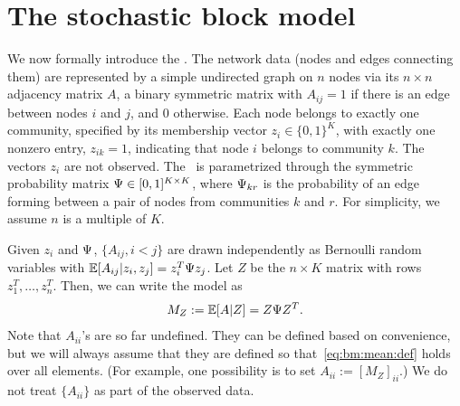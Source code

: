 %
\section{The stochastic block model}\label{sec:SBM:def}
We now formally introduce the \SBM.   The network data (nodes and edges connecting them) are represented by a
simple undirected graph on $n$ nodes via its $n \times n$ adjacency
matrix $A$, a binary symmetric matrix with %
$A_{ij} = 1$ if there is an edge between nodes $i$ and $j$, and 0
otherwise.   Each node belongs to exactly one community, specified by
its membership vector $z_i \in \{0,1\}^K$, with exactly one
nonzero entry, $z_{ik} = 1$, indicating that node $i$ belongs to community $k$.  The vectors $z_i$ are not observed.   
The \SBM\ is parametrized through the symmetric probability matrix $\Psi \in
[0,1]^{K \times K}$, where $\Psi_{kr}$ is the probability of an edge
forming between a pair of nodes from communities $k$ and $r$. For
simplicity, we assume $n$ is a multiple of $K$. 

Given $z_i$ and $\Psi$, $\{A_{ij}, i < j\}$ are drawn independently as
Bernoulli random variables with $\mathbb{E}[A_{ij} | z_i,z_j] = z_i^T \Psi
z_j$. Let $Z$ be the $n \times K$ matrix with rows $z_1^T,\dots,z_n^T$. Then, we can write the model as
\begin{align}\label{eq:bm:mean:def}
 	M_Z:= \mathbb{E}[A | Z] = Z \Psi Z^T. 
\end{align}
Note that $A_{ii}$'s are so far undefined. They can be defined based on convenience, but we will always assume that they are defined so that~\eqref{eq:bm:mean:def} holds over all elements. (For example, one possibility is to set $A_{ii} := [M_Z]_{ii}$.) We do not treat $\{A_{ii}\}$ as part of the observed data.

